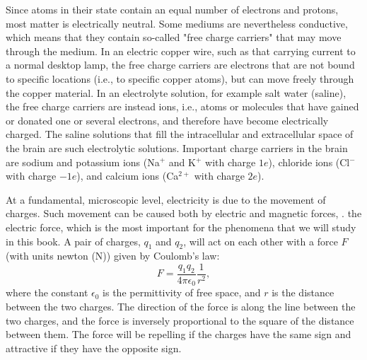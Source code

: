 Since atoms in their  state contain an equal number of electrons and protons, most matter is electrically neutral. Some mediums are nevertheless conductive, which means that they contain so-called "free charge carriers" that may move through the medium. In an electric copper wire, such as that carrying current to a normal desktop lamp, the free charge carriers are electrons that are not bound to specific locations (i.e., to specific copper atoms), but can move freely through the copper material. In an electrolyte solution, for example salt water (saline), the free charge carriers are instead ions, i.e., atoms or molecules that have gained or donated one or several electrons, and therefore have become electrically charged. The saline solutions that fill the intracellular and extracellular space of the brain are such electrolytic solutions. Important charge carriers in the brain are sodium and potassium ions (Na$^+$ and K$^+$ with charge $1e$), chloride ions (Cl$^-$ with charge $-1e$), and calcium ions (Ca$^{2+}$ with charge $2e$).

At a fundamental, microscopic level, electricity is due to the movement of charges. Such movement can be caused both by electric and magnetic forces, .  the electric force, which is the most important for the phenomena that we will study in this book. A pair of charges, $q_1$ and $q_2$, will act on each other with a force $F$ (with units newton (\si{\newton})) given by Coulomb's law:
\begin{equation}
F = \frac{q_1q_2}{4\pi \epsilon_0} \frac{1}{r^2},
\label{eq:Basics:CoulombF}
\end{equation}
where the constant $\epsilon_0$ is the permittivity of free space, and $r$ is the distance between the two charges. The direction of the force is along the line between the two charges, and the force is inversely proportional to the square of the distance between them. The force will be repelling if the charges have the same sign and attractive if they have the opposite sign. 

